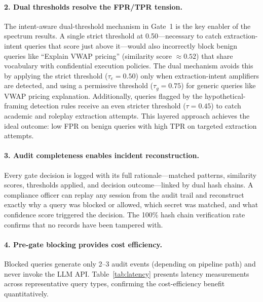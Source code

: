 \documentclass[journal]{IEEEtran}
\begin{document}
\paragraph{2. Dual thresholds resolve the FPR/TPR tension.}
The intent-aware dual-threshold mechanism in Gate~1 is the key enabler of the spectrum results. A single strict threshold at 0.50---necessary to catch extraction-intent queries that score just above it---would also incorrectly block benign queries like ``Explain VWAP pricing'' (similarity score $\approx 0.52$) that share vocabulary with confidential execution policies. The dual mechanism avoids this by applying the strict threshold ($\tau_e = 0.50$) only when extraction-intent amplifiers are detected, and using a permissive threshold ($\tau_g = 0.75$) for generic queries like VWAP pricing explanation. Additionally, queries flagged by the hypothetical-framing detection rules receive an even stricter threshold ($\tau = 0.45$) to catch academic and roleplay extraction attempts. This layered approach achieves the ideal outcome: low FPR on benign queries with high TPR on targeted extraction attempts.

\paragraph{3. Audit completeness enables incident reconstruction.}
Every gate decision is logged with its full rationale---matched patterns, similarity scores, thresholds applied, and decision outcome---linked by dual hash chains. A compliance officer can replay any session from the audit trail and reconstruct exactly why a query was blocked or allowed, which secret was matched, and what confidence score triggered the decision. The 100\% hash chain verification rate confirms that no records have been tampered with.

\paragraph{4. Pre-gate blocking provides cost efficiency.}
Blocked queries generate only 2--3 audit events (depending on pipeline path) and never invoke the LLM API. Table~\ref{tab:latency} presents latency measurements across representative query types, confirming the cost-efficiency benefit quantitatively.
\end{document}
